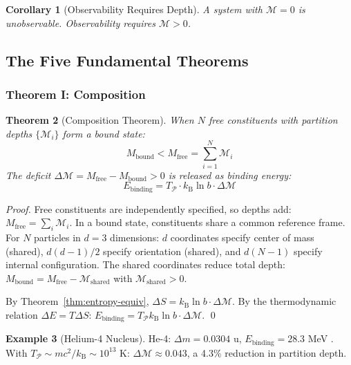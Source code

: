 \documentclass[twocolumn,10pt,a4paper]{article}
\newtheorem{theorem}{Theorem}[section]
\newtheorem{corollary}[theorem]{Corollary}
\theoremstyle{definition}
\newtheorem{example}[theorem]{Example}
\theoremstyle{remark}
\newcommand{\kB}{k_{\mathrm{B}}}
\newcommand{\Depth}{\mathcal{M}}
\newcommand{\Partition}{\mathcal{P}}
\newcommand{\Mfree}{M_{\mathrm{free}}}
\newcommand{\Mbound}{M_{\mathrm{bound}}}
\begin{document}
\begin{corollary}[Observability Requires Depth]
\label{cor:observability}
A system with $\Depth = 0$ is unobservable. Observability requires $\Depth > 0$.
\end{corollary}

\subsection{The Five Fundamental Theorems}

\subsubsection{Theorem I: Composition}

\begin{theorem}[Composition Theorem]
\label{thm:composition}
When $N$ free constituents with partition depths $\{\Depth_i\}$ form a bound state:
\begin{equation}
    \Mbound < \Mfree = \sum_{i=1}^{N} \Depth_i
\end{equation}
The deficit $\Delta\Depth = \Mfree - \Mbound > 0$ is released as binding energy:
\begin{equation}
    E_{\text{binding}} = T_{\Partition} \cdot \kB \ln b \cdot \Delta\Depth
\end{equation}
\end{theorem}

\begin{proof}
Free constituents are independently specified, so depths add: $\Mfree = \sum_i \Depth_i$. In a bound state, constituents share a common reference frame. For $N$ particles in $d = 3$ dimensions: $d$ coordinates specify center of mass (shared), $d(d-1)/2$ specify orientation (shared), and $d(N-1)$ specify internal configuration. The shared coordinates reduce total depth: $\Mbound = \Mfree - \Depth_{\text{shared}}$ with $\Depth_{\text{shared}} > 0$.

By Theorem~\ref{thm:entropy-equiv}, $\Delta S = \kB \ln b \cdot \Delta\Depth$. By the thermodynamic relation $\Delta E = T\Delta S$: $E_{\text{binding}} = T_{\Partition} \kB \ln b \cdot \Delta\Depth$. \qed
\end{proof}

\begin{example}[Helium-4 Nucleus]
He-4: $\Delta m = 0.0304$ u, $E_{\text{binding}} = 28.3$ MeV \citep{weizsacker1935}. With $T_{\Partition} \sim mc^2/\kB \sim 10^{13}$ K: $\Delta\Depth \approx 0.043$, a 4.3\% reduction in partition depth.
\end{example}
\end{document}
